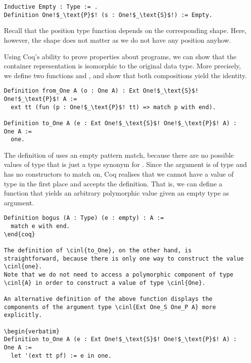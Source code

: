 \begin{verbatim}
Inductive Empty : Type := .
Definition One!$_\text{P}$! (s : One!$_\text{S}$!) := Empty.
\end{verbatim}

Recall that the position type function depends on the corresponding shape.
Here, however, the shape does not matter as we do not have any position anyhow.

Using Coq's ability to prove properties about programs, we can show that the container representation is isomorphic to the original data type.
More precisely, we define two functions  and , and show that both compositions yield the identity.

\begin{verbatim}
Definition from_One A (o : One A) : Ext One!$_\text{S}$! One!$_\text{P}$! A :=
  ext tt (fun (p : One!$_\text{P}$! tt) => match p with end).

Definition to_One A (e : Ext One!$_\text{S}$! One!$_\text{P}$! A) : One A :=
  one.
\end{verbatim}

The definition of  uses an empty pattern match, because there are no possible values of type  that is just a type synonym for .
Since the argument  is of type  and  has no constructors to match on, Coq realises that we cannot have a value of type  in the first place and accepts the definition.
That is, we can define a function that yields an arbitrary polymorphic value given an empty type as argument.

\begin{verbatim}
Definition bogus (A : Type) (e : empty) : A :=
  match e with end.
\end{coq}

The definition of \cinl{to_One}, on the other hand, is straightforward, because there is only one way to construct the value \cinl{one}.
Note that we do not need to access a polymorphic component of type \cinl{A} in order to construct a value of type \cinl{One}.

An alternative definition of the above function displays the components of the argument type \cinl{Ext One_S One_P A} more explicitly.

\begin{verbatim}
Definition to_One A (e : Ext One!$_\text{S}$! One!$_\text{P}$! A) : One A :=
  let '(ext tt pf) := e in one.
\end{verbatim}

